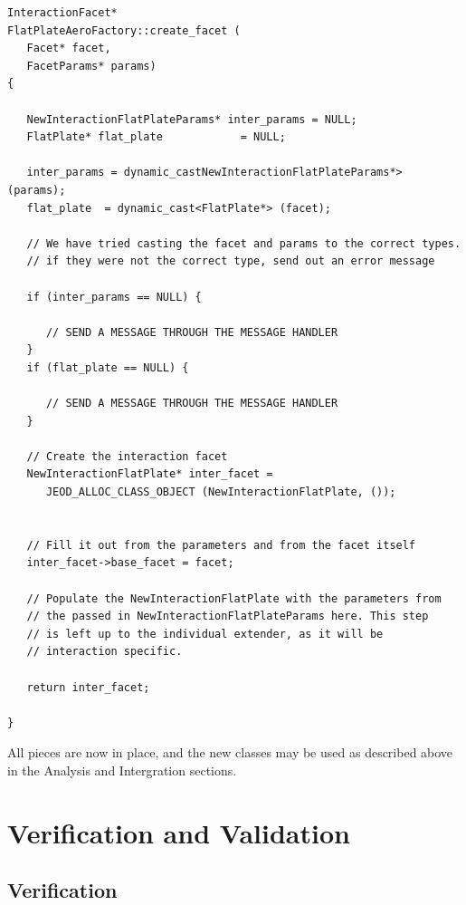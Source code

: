 \begin{verbatim}
InteractionFacet*
FlatPlateAeroFactory::create_facet (
   Facet* facet,
   FacetParams* params)
{

   NewInteractionFlatPlateParams* inter_params = NULL;
   FlatPlate* flat_plate            = NULL;

   inter_params = dynamic_castNewInteractionFlatPlateParams*> (params);
   flat_plate  = dynamic_cast<FlatPlate*> (facet);

   // We have tried casting the facet and params to the correct types.
   // if they were not the correct type, send out an error message

   if (inter_params == NULL) {

      // SEND A MESSAGE THROUGH THE MESSAGE HANDLER
   }
   if (flat_plate == NULL) {

      // SEND A MESSAGE THROUGH THE MESSAGE HANDLER
   }

   // Create the interaction facet
   NewInteractionFlatPlate* inter_facet =
      JEOD_ALLOC_CLASS_OBJECT (NewInteractionFlatPlate, ());


   // Fill it out from the parameters and from the facet itself
   inter_facet->base_facet = facet;

   // Populate the NewInteractionFlatPlate with the parameters from
   // the passed in NewInteractionFlatPlateParams here. This step
   // is left up to the individual extender, as it will be
   // interaction specific.

   return inter_facet;

}
\end{verbatim}

All pieces are now in place, and the new classes may be used
as described above in the Analysis and Intergration sections.



\chapter{Verification and Validation}\label{ch:ivv}



\section{Verification}

